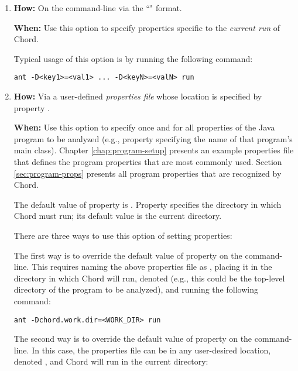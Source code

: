 \begin{enumerate}
\item

{\bf How:} On the command-line via the ``" format.

{\bf When:} Use this option to specify properties specific to the {\it current run} of Chord.

Typical usage of this option is by running the following command:

\begin{framed}
\begin{verbatim}
ant -D<key1>=<val1> ... -D<keyN>=<valN> run
\end{verbatim}
\end{framed}

\item

{\bf How:} Via a user-defined {\it properties file} whose location is specified by property .

{\bf When:} Use this option to specify once and for all properties of the
Java program to be analyzed (e.g., property  specifying the
name of that program's main class).
Chapter \ref{chap:program-setup} presents an example properties file 
that defines the program properties that are most commonly used.  Section \ref{sec:program-props}
presents all program properties that are recognized by Chord. 

The default value of property  is .
Property  specifies the directory in which Chord must run; its default value
is the current directory.

There are three ways to use this option of setting properties:

The first way is to override the default value of property  on the command-line.
This requires naming the above properties file as , placing it in the
directory in which Chord will run, denoted 
(e.g., this could be the top-level directory of the program to be analyzed),
and running the following command:

\begin{framed}
\begin{verbatim}
ant -Dchord.work.dir=<WORK_DIR> run
\end{verbatim}
\end{framed}

The second way is to override the default value of property  on the command-line.
In this case, the properties file can be in any user-desired location, denoted , and Chord
will run in the current directory:


\end{enumerate}

